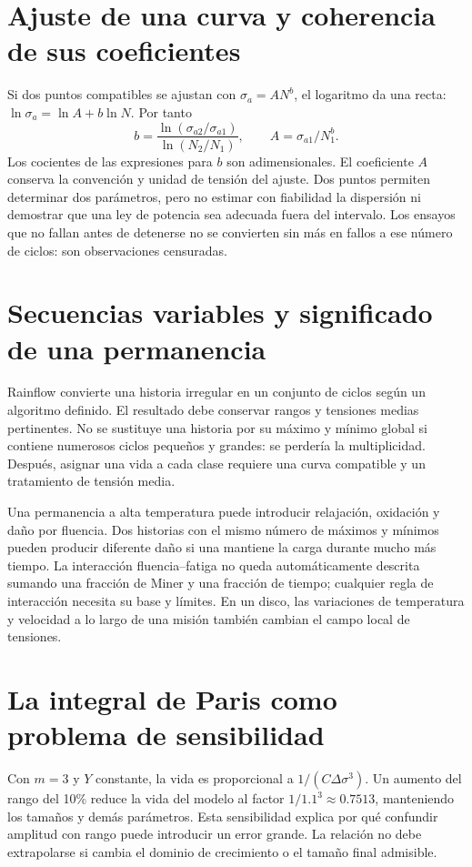 
\section{Ajuste de una curva y coherencia de sus coeficientes}
Si dos puntos compatibles se ajustan con $\sigma_a=A N^b$, el logaritmo da una recta: $\ln\sigma_a=\ln A+b\ln N$. Por tanto
\begin{equation}b=\frac{\ln(\sigma_{a2}/\sigma_{a1})}{\ln(N_2/N_1)},\qquad A=\sigma_{a1}/N_1^b.\end{equation}
Los cocientes de las expresiones para $b$ son adimensionales. El coeficiente $A$ conserva la convención y unidad de tensión del ajuste. Dos puntos permiten determinar dos parámetros, pero no estimar con fiabilidad la dispersión ni demostrar que una ley de potencia sea adecuada fuera del intervalo. Los ensayos que no fallan antes de detenerse no se convierten sin más en fallos a ese número de ciclos: son observaciones censuradas.
\section{Secuencias variables y significado de una permanencia}
Rainflow convierte una historia irregular en un conjunto de ciclos según un algoritmo definido. El resultado debe conservar rangos y tensiones medias pertinentes. No se sustituye una historia por su máximo y mínimo global si contiene numerosos ciclos pequeños y grandes: se perdería la multiplicidad. Después, asignar una vida a cada clase requiere una curva compatible y un tratamiento de tensión media.

Una permanencia a alta temperatura puede introducir relajación, oxidación y daño por fluencia. Dos historias con el mismo número de máximos y mínimos pueden producir diferente daño si una mantiene la carga durante mucho más tiempo. La interacción fluencia--fatiga no queda automáticamente descrita sumando una fracción de Miner y una fracción de tiempo; cualquier regla de interacción necesita su base y límites. En un disco, las variaciones de temperatura y velocidad a lo largo de una misión también cambian el campo local de tensiones.
\section{La integral de Paris como problema de sensibilidad}
Con $m=3$ y $Y$ constante, la vida es proporcional a $1/(C\Delta\sigma^3)$. Un aumento del rango del 10\% reduce la vida del modelo al factor $1/1.1^3\approx0.7513$, manteniendo los tamaños y demás parámetros. Esta sensibilidad explica por qué confundir amplitud con rango puede introducir un error grande. La relación no debe extrapolarse si cambia el dominio de crecimiento o el tamaño final admisible.


